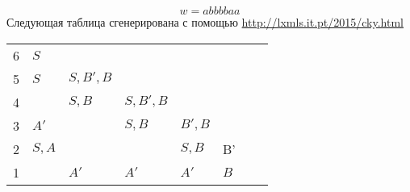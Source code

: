 \documentclass[12pt]{article}
\begin{document}
\begin{enumerate}
        \[
            w = abbbbaa
        \]
        Следующая таблица сгенерирована с помощью \url{http://lxmls.it.pt/2015/cky.html}
\begin{table}[h]
\begin{tabular}{llllllll}
\cline{2-8}
\multicolumn{1}{l|}{\cellcolor[HTML]{DAE8FC}6} & \multicolumn{1}{l|}{$S$}   & \multicolumn{1}{l|}{\cellcolor[HTML]{9B9B9B}} & \multicolumn{1}{l|}{\cellcolor[HTML]{9B9B9B}} & \multicolumn{1}{l|}{\cellcolor[HTML]{9B9B9B}} & \multicolumn{1}{l|}{\cellcolor[HTML]{9B9B9B}} & \multicolumn{1}{l|}{\cellcolor[HTML]{9B9B9B}} & \multicolumn{1}{l|}{\cellcolor[HTML]{9B9B9B}} \\ \cline{2-8} 
\multicolumn{1}{l|}{\cellcolor[HTML]{DAE8FC}5} & \multicolumn{1}{l|}{$S$}   & \multicolumn{1}{l|}{$S, B', B$}               & \multicolumn{1}{l|}{\cellcolor[HTML]{9B9B9B}} & \multicolumn{1}{l|}{\cellcolor[HTML]{9B9B9B}} & \multicolumn{1}{l|}{\cellcolor[HTML]{9B9B9B}} & \multicolumn{1}{l|}{\cellcolor[HTML]{9B9B9B}} & \multicolumn{1}{l|}{\cellcolor[HTML]{9B9B9B}} \\ \cline{2-8} 
\multicolumn{1}{l|}{\cellcolor[HTML]{DAE8FC}4} & \multicolumn{1}{l|}{}      & \multicolumn{1}{l|}{$S, B$}                   & \multicolumn{1}{l|}{$S, B', B$}               & \multicolumn{1}{l|}{\cellcolor[HTML]{9B9B9B}} & \multicolumn{1}{l|}{\cellcolor[HTML]{9B9B9B}} & \multicolumn{1}{l|}{\cellcolor[HTML]{9B9B9B}} & \multicolumn{1}{l|}{\cellcolor[HTML]{9B9B9B}} \\ \cline{2-8} 
\multicolumn{1}{l|}{\cellcolor[HTML]{DAE8FC}3} & \multicolumn{1}{l|}{$A'$}  & \multicolumn{1}{l|}{}                         & \multicolumn{1}{l|}{$S, B$}                   & \multicolumn{1}{l|}{$B', B$}                  & \multicolumn{1}{l|}{\cellcolor[HTML]{9B9B9B}} & \multicolumn{1}{l|}{\cellcolor[HTML]{9B9B9B}} & \multicolumn{1}{l|}{\cellcolor[HTML]{9B9B9B}} \\ \cline{2-8} 
\multicolumn{1}{l|}{\cellcolor[HTML]{DAE8FC}2} & \multicolumn{1}{l|}{$S,A$} & \multicolumn{1}{l|}{}                         & \multicolumn{1}{l|}{}                         & \multicolumn{1}{l|}{$S, B$}                   & \multicolumn{1}{l|}{B'}                       & \multicolumn{1}{l|}{\cellcolor[HTML]{9B9B9B}} & \multicolumn{1}{l|}{\cellcolor[HTML]{9B9B9B}} \\ \cline{2-8} 
\multicolumn{1}{l|}{\cellcolor[HTML]{DAE8FC}1} & \multicolumn{1}{l|}{}      & \multicolumn{1}{l|}{$A'$}                     & \multicolumn{1}{l|}{$A'$}                     & \multicolumn{1}{l|}{$A'$}                     & \multicolumn{1}{l|}{$B$}                      & \multicolumn{1}{l|}{\cellcolor[HTML]{FFFFFF}} & \multicolumn{1}{l|}{\cellcolor[HTML]{9B9B9B}} \\ \cline{2-8} 

\end{tabular}
\end{table}
\end{enumerate}
\end{document}
